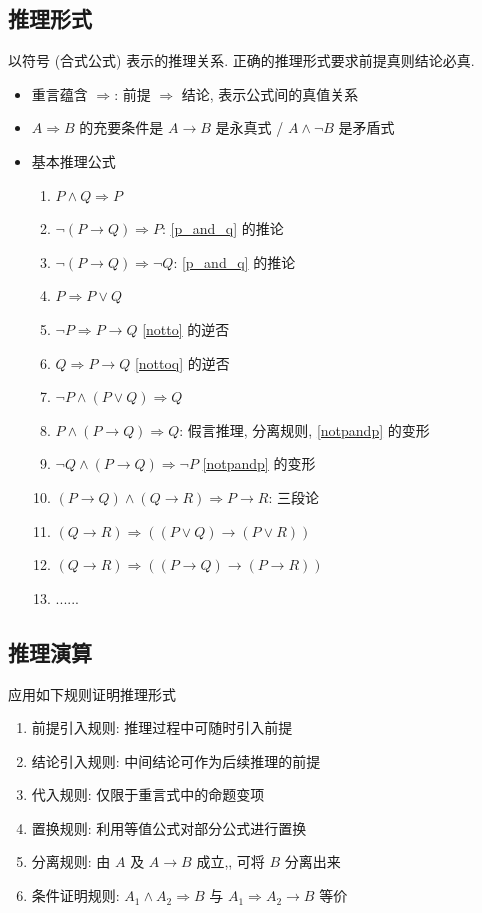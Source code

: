 \documentclass[11pt,a4paper,twocolumn,fleqn]{article} %
\begin{document}
\subsection{推理形式} %
\label{sub:reasoning}
以符号 (合式公式) 表示的推理关系. 正确的推理形式要求前提真则结论必真. 
\begin{itemize}
	\item 重言蕴含 $\Rightarrow$: 前提 $\Rightarrow$ 结论, 表示公式间的真值关系
	\item $A\Rightarrow B$ 的充要条件是 $A\to B$ 是永真式 / 
	$A\land \lnot B$ 是矛盾式
	\item 基本推理公式
	\begin{enumerate}
		\item $P\land Q \Rightarrow P$ \label{p_and_q}
		\item $\lnot(P\to Q) \Rightarrow P$: \ref{p_and_q} 的推论 \label{notto}
		\item $\lnot (P\to Q) \Rightarrow \lnot Q$: \ref{p_and_q} 的推论
				\label{nottoq}
		\item $P\Rightarrow P\lor Q$
		\item $\lnot P \Rightarrow P\to Q$ \ref{notto} 的逆否
		\item $Q\Rightarrow P\to Q$ \ref{nottoq} 的逆否
		\item $\lnot P \land (P \lor Q) \Rightarrow Q$ \label{notpandp}
		\item $P\land (P\to Q) \Rightarrow Q$: 假言推理, 分离规则, 
				\ref{notpandp} 的变形
		\item $\lnot Q \land (P\to Q) \Rightarrow \lnot P$ \ref{notpandp} 的变形
		\item $(P\to Q)\land (Q\to R) \Rightarrow P\to R$: 三段论
		\item $(Q\to R) \Rightarrow ((P\lor Q) \to (P\lor R))$
		\item $(Q\to R) \Rightarrow ((P\to Q) \to (P\to R))$
		\item ......
	\end{enumerate}
\end{itemize}
\subsection{推理演算} %
\label{sub:reasoning_calculation}
应用如下规则证明推理形式
\begin{enumerate}
	\item 前提引入规则: 推理过程中可随时引入前提
	\item 结论引入规则: 中间结论可作为后续推理的前提
	\item 代入规则: 仅限于重言式中的命题变项
	\item 置换规则: 利用等值公式对部分公式进行置换
	\item 分离规则: 由 $A$ 及 $A\to B$ 成立,, 可将 $B$ 分离出来
	\item 条件证明规则: $A_1\land A_2 \Rightarrow B$ 与 
	$A_1 \Rightarrow A_2\to B$ 等价
\end{enumerate}
\end{document}

